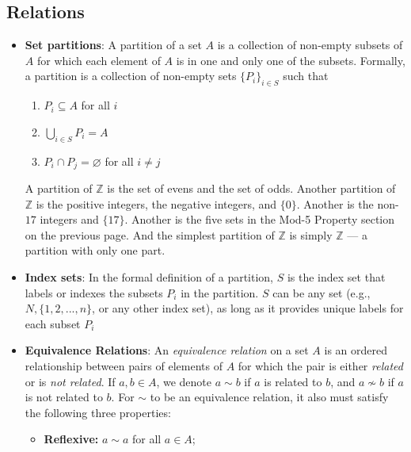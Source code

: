 \documentclass{report}
\begin{document}
    \subsection{Relations}
    \begin{itemize}
        \item \textbf{Set partitions}: A partition of a set $A$ is a collection of non-empty subsets of $A$ for which each element of $A$ is in one and only one of the subsets.
            \bigbreak \noindent 
            Formally, a partition is a collection of non-empty sets $\{P_{i}\}_{i\in S} $ such that
            \begin{enumerate}
                \item $P_{i} \subseteq A $ for all $i$
                \item $\bigcup_{i\in S} P_{i} = A$
                \item $P_{i} \cap P_{j} = \varnothing$ for all $i\ne j $
            \end{enumerate}
            \bigbreak \noindent 
            A partition of \( \mathbb{Z} \) is the set of evens and the set of odds. Another partition of \( \mathbb{Z} \) is the positive integers, the negative integers, and \(\{0\}\). Another is the non-\(17\) integers and \(\{17\}\). Another is the five sets in the Mod-5 Property section on the previous page. And the simplest partition of \( \mathbb{Z} \) is simply \( \mathbb{Z} \) — a partition with only one part.
        \item \textbf{Index sets}: In the formal definition of a partition, $S$ is the index set that labels or indexes the subsets $P_{i}$ in the partition. 
            \bigbreak \noindent 
            $S$ can be any set (e.g., $N,\{1,2,...,n\}$, or any other index set), as long as it provides unique labels for each subset $P_{i}$
        \item \textbf{Equivalence Relations}: An \emph{equivalence relation} on a set \( A \) is an ordered relationship between pairs of elements of \( A \) for which the pair is either \emph{related} or is \emph{not related}. If \( a, b \in A \), we denote \( a \sim b \) if \( a \) is related to \( b \), and \( a \not\sim b \) if \( a \) is not related to \( b \).
            \bigbreak \noindent 
            For \( \sim \) to be an equivalence relation, it also must satisfy the following three properties:
            \begin{itemize}
                \item \textbf{Reflexive:} \( a \sim a \) for all \( a \in A \);

\end{itemize}
\end{itemize}
\end{document}
